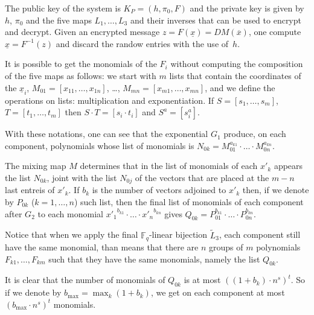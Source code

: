 \documentclass[12pt,a4paper]{amsart}
\theoremstyle{remark}
\theoremstyle{definition}
\newcommand\gfq{{\mathbb{F}_q}}
\begin{document}
The public key of the system is $K_P=(h,\pi_0,F)$ and the private key is
given by $h$, $\pi_0$ and the five maps $L_1,\dots,L_3$ and their inverses
that can be used to encrypt and decrypt. Given an encrypted message $z=F(\underline{x})=
DM(\overline{x})$, one compute $\underline{x}=F^{-1}(z)$ and discard the randow entries
with the use of~$h$.

It is possible to get the monomials of the $F_i$ without computing the composition
of the five maps as follows: we start with $m$ lists that contain
the coordinates of the $\underline{x}_i$, $M_{01}=[x_{11},\dots,x_{1n}]$, \dots,
$M_{mn}=[x_{m1},\dots,x_{mn}]$, and we define the operations on lists: multiplication
and exponentiation. If $S=[s_1,\dots,s_m]$, $T=[t_1,\dots,t_m]$ then
$S\cdot T=[s_i\cdot t_i]$ and $S^a=[s_i^a]$.

With these notations, one can see that the exponential $G_1$ produce, on each component,
polynomials whose list of monomials is $N_{0k}=M_{01}^{a_{k1}}\cdot\ldots\cdot M_{0n}^{a_{kn}}$.

The mixing map $M$ determines that in the list of monomials of each $x'_k$ appears
the list $N_{0k}$, joint with the list $N_{0j}$ of the vectors that are placed
at the $m-n$ last entreis of $x'_k$. If $b_k$ is the number of vectors adjoined
to $x'_k$ then, if we denote by $P_{0k}$ ($k=1,\dots,n$) such list, then the final
list of monomials of each component after $G_2$ to each monomial ${x'_1}^{b_{k1}}\cdot\ldots\cdot{x'_n}^{b_{kn}}$ gives $Q_{0k}=P_{01}^{b_{k1}}\cdot\ldots\cdot P_{0n}^{b_{kn}}$.

Notice that when we apply the final $\gfq$-linear bijection $\tilde{L}_3$,
each component still have the same monomial, than means that there are $n$ groups
of $m$ polynomials $F_{k1},\dots,F_{km}$ such that they have the same monomials,
namely the list $Q_{0k}$.

It is clear that the number of monomials of $Q_{0k}$ is at most $((1+b_k)\cdot n^s)^t$.
So if we denote by $b_{\max}=\max_k(1+b_k)$, we get on each component
at most $(b_{\max}\cdot n^s)^t$ monomials.
\end{document}
